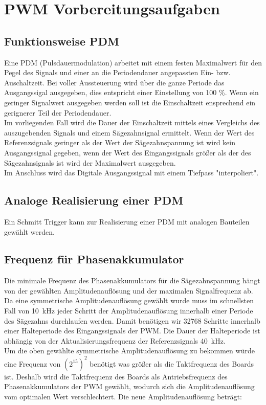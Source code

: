 \documentclass[a4paper,11pt,DIV=11,parskip=half]{scrartcl}
\begin{document}
\section{PWM Vorbereitungsaufgaben}
\subsection{Funktionsweise PDM}
Eine PDM (Pulsdauermodulation) arbeitet mit einem festen Maximalwert für den Pegel des Signals und einer an die Periodendauer angepassten Ein- bzw. Auschaltzeit. Bei voller Aussteuerung wird über die ganze Periode das Ausgangssigal ausgegeben, dies entspricht einer Einstellung von 100 \%. 
Wenn ein geringer Signalwert ausgegeben werden soll ist die Einschaltzeit ensprechend ein gerignerer Teil der Periodendauer. \\
Im vorliegenden Fall wird die Dauer der Einschaltzeit mittels eines Vergleichs des auszugebenden Signals und einem Sägezahnsignal ermittelt. Wenn der Wert des Referenzsignals geringer als der Wert der Sägezahnspannung ist wird kein Ausgangssignal gegeben, wenn der Wert des Eingangssignals größer als der des Sägezahnsignals ist wird der Maximalwert ausgegeben. \\
Im Anschluss wird das Digitale Ausgangssignal mit einem Tiefpass "interpoliert".
\subsection{Analoge Realisierung einer PDM}
Ein Schmitt Trigger kann zur Realisierung einer PDM mit analogen Bauteilen gewählt werden.
\subsection{Frequenz für Phasenakkumulator}
Die minimale Frequenz des Phasenakkumulators für die Sägezahnspannung hängt von der gewählten Amplitudenauflösung und der maximalen Signalfrequenz ab. \\
Da eine symmetrische Amplitudenauflösung gewählt wurde muss im schnellsten Fall von \SI{10}{kHz} jeder Schritt der Amplitudenauflösung innerhalb einer Periode des Sägezahns durchlaufen werden.
Damit benötigen wir 32768 Schritte innerhalb einer Halteperiode des Eingangssignals der PWM. Die Dauer der Halteperiode ist abhängig von der Aktualisierungsfrequenz der Referenzsignals \SI{40}{kHz}. \\ Um die oben gewählte symmetrische Amplitudenauflösung zu bekommen würde eine Frequenz von $(2^{15})^2$ benötigt was größer als die Taktfrequenz des Boards ist. Deshalb wird die Taktfrequenz des Boards als Antriebsfrequenz des Phasenakkumulators der PWM gewählt, wodurch sich die Amplitudenauflösung vom optimalen Wert verschlechtert. 
Die neue Amplitudenauflösung beträgt: 
\end{document}
